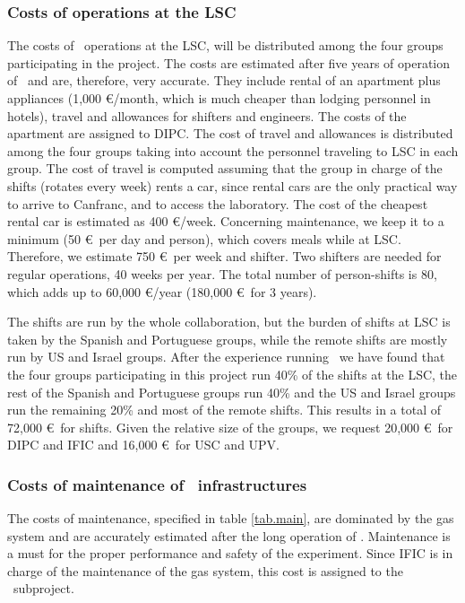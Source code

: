 \subsubsection{Costs of operations at the LSC}
\label{sec:operationcost}
The costs of \Next\ operations at the LSC, will be distributed among the four groups participating in the project. The costs are estimated after five years of operation of \New\ and are, therefore, very accurate. They include rental of an apartment plus appliances (1,000 \euro/month, which is much cheaper than lodging personnel in hotels), travel and allowances for shifters and engineers.  The costs of the apartment are assigned to DIPC. The cost of travel and allowances is distributed among the four groups taking into account the personnel traveling to LSC in each group. The cost of travel is computed assuming that the group in charge of the shifts (rotates every week) rents a car, since rental cars are the only practical way to arrive to Canfranc, and to access the laboratory. The cost of the cheapest rental car is estimated as 400 \euro/week. Concerning maintenance, we keep it to a minimum (50 \euro\ per day and person), which covers meals while at LSC. Therefore, we estimate 750 \euro\ per week and shifter. Two shifters are needed for regular operations, 40 weeks per year. The total number of person-shifts is 80, which adds up to 60,000 \euro/year (180,000 \euro\ for 3 years).

The shifts are run by the whole collaboration, but the burden of shifts at LSC is taken by the Spanish and Portuguese groups, while the remote shifts are mostly run by US and Israel groups. After the experience running \NEW\, we have found that the four groups participating in this project run 40\% of the shifts at the LSC, the rest of the Spanish and Portuguese groups run 40\% and the US and Israel groups run the remaining 20\% and most of the remote shifts. This results in a total of 
72,000 \euro\ for shifts. Given the relative size of the groups, we request 20,000 \euro\ for DIPC and IFIC and 16,000 \euro\ for USC and UPV.

\subsubsection{Costs of maintenance of \Next\ infrastructures}

The costs of maintenance, specified in table \ref{tab.main}, are dominated by the gas system and are accurately estimated after the long operation of \NEW. Maintenance is a must for the proper performance and safety of the experiment. Since IFIC is in charge of the maintenance of the gas system, this cost is assigned to the \sIFIC\ subproject.

